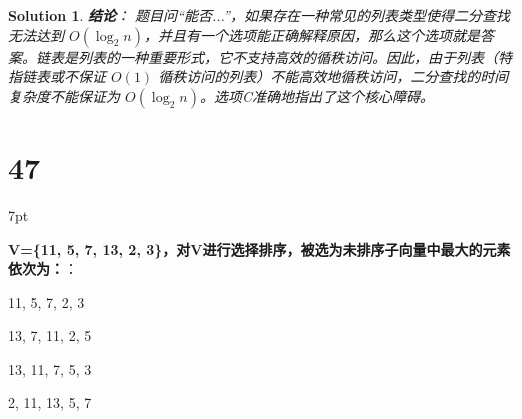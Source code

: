 \documentclass[UTF8]{report}
\newtheorem{solution}{Solution}
\theoremstyle{MyLineTheoremStyle} %
\theoremstyle{MyBlockTheoremStyle} %
\theoremstyle{MySubsubsectionStyle} %
\newenvironment{graybox}{%
        \def\FrameCommand{%
        \hspace{1pt}%
        {\color{gray}\small \vrule width 2pt}%
        {\color{graybox_color}\vrule width 4pt}%
        \colorbox{graybox_color}%
        }%
        \MakeFramed{\advance\hsize-\width\FrameRestore}%
        \noindent\hspace{-4.55pt}%
        \begin{adjustwidth}{}{7pt}%
        \vspace{2pt}\vspace{2pt}%
        }
        {%
        \vspace{2pt}\end{adjustwidth}\endMakeFramed%
        }
\begin{document}
\begin{solution}
\textbf{结论}：
题目问“能否...”，如果存在一种常见的列表类型使得二分查找无法达到 $O(\log_2 n)$，并且有一个选项能正确解释原因，那么这个选项就是答案。链表是列表的一种重要形式，它不支持高效的循秩访问。因此，由于列表（特指链表或不保证 $O(1)$ 循秩访问的列表）不能高效地循秩访问，二分查找的时间复杂度不能保证为 $O(\log_2 n)$。选项C准确地指出了这个核心障碍。
\end{solution}


\section*{47}

\begin{graybox}
\textbf{V=\{11, 5, 7, 13, 2, 3\}，对V进行选择排序，被选为未排序子向量中最大的元素依次为：}：
\begin{circledenum}
    \item 11, 5, 7, 2, 3
    \item 13, 7, 11, 2, 5
    \item 13, 11, 7, 5, 3
    \item 2, 11, 13, 5, 7
\end{circledenum}
\end{graybox}
\end{document}
